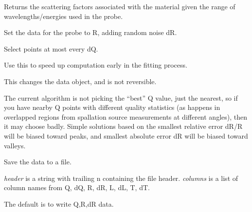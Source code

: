 \documentclass[letterpaper,10pt,english]{sphinxmanual}
\begin{document}
\begin{fulllineitems}

\begin{fulllineitems}
\label{api/probe:refl1d.probe.XrayProbe.scattering_factors}
Returns the scattering factors associated with the material given
the range of wavelengths/energies used in the probe.

\end{fulllineitems}


\begin{fulllineitems}
\label{api/probe:refl1d.probe.XrayProbe.simulate_data}
Set the data for the probe to R, adding random noise dR.

\end{fulllineitems}


\begin{fulllineitems}
\label{api/probe:refl1d.probe.XrayProbe.subsample}
Select points at most every dQ.

Use this to speed up computation early in the fitting process.

This changes the data object, and is not reversible.

The current algorithm is not picking the ``best'' Q value, just the
nearest, so if you have nearby Q points with different quality
statistics (as happens in overlapped regions from spallation
source measurements at different angles), then it may choose
badly.  Simple solutions based on the smallest relative error dR/R
will be biased toward peaks, and smallest absolute error dR will
be biased toward valleys.

\end{fulllineitems}


\begin{fulllineitems}
\label{api/probe:refl1d.probe.XrayProbe.write_data}
Save the data to a file.

\emph{header} is a string with trailing n containing the file header.
\emph{columns} is a list of column names from Q, dQ, R, dR, L, dL, T, dT.

The default is to write Q,R,dR data.

\end{fulllineitems}


\end{fulllineitems}
\end{document}
